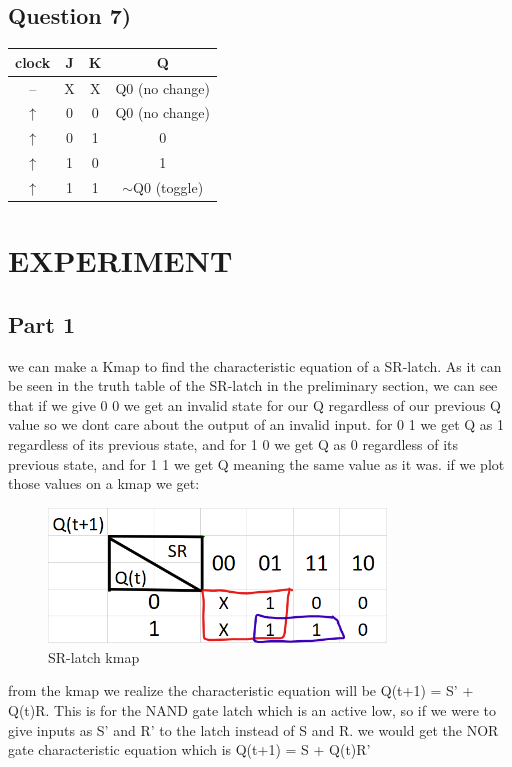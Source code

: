 \documentclass[pdftex,12pt,a4paper]{article}
\begin{document}
\subsection{Question 7)}


\begin{table}[H]
\begin{tabular}{|c|c|c|c|}
\hline
clock & J & K & Q                 \\ \hline
--    & X & X & Q0 (no change)    \\ \hline
$\uparrow$     & 0 & 0 & Q0 (no change)    \\ \hline
$\uparrow$     & 0 & 1 & 0                 \\ \hline
$\uparrow$     & 1 & 0 & 1                 \\ \hline
$\uparrow$     & 1 & 1 & $\sim$Q0 (toggle) \\ \hline
\end{tabular}
\end{table}

\section{EXPERIMENT}
\subsection{Part 1}
we can make a Kmap to find the characteristic equation of a SR-latch. As it can be seen in the truth table of the SR-latch in the preliminary section, we can see that if we give 0 0 we get an invalid state for our Q regardless of our previous Q value so we dont care about the output of an invalid input. for 0 1 we get Q as 1 regardless of its previous state, and for 1 0 we get Q as 0 regardless of its previous state, and for 1 1 we get Q meaning the same value as it was. if we plot those values on a kmap we get:
    \begin{figure}[H]
    	\centering
    	\includegraphics[width=0.8\textwidth]{kmap/sr_char.png}	
    	\caption{SR-latch kmap}
    	\label{SR-latch kmap}
    \end{figure}
from the kmap we realize the characteristic equation will be Q(t+1) = S' + Q(t)R. This is for the NAND gate latch which is an active low, so if we were to give inputs as S' and R' to the latch instead of S and R. we would get the NOR gate characteristic equation which is Q(t+1) = S + Q(t)R'
\end{document}
